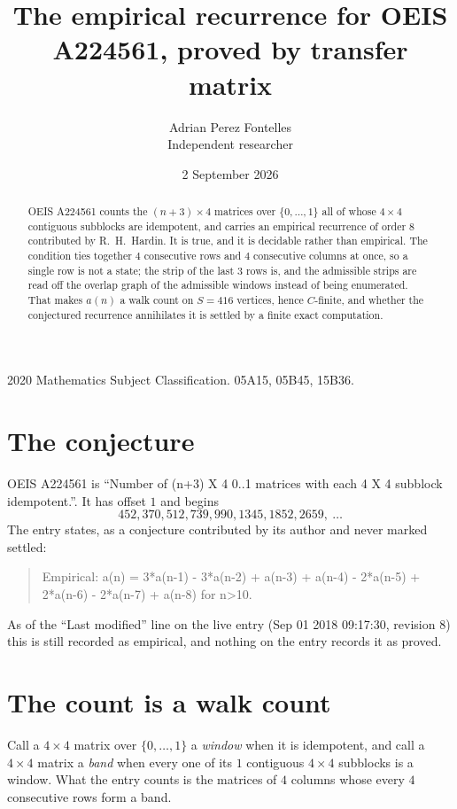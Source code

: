 \documentclass[11pt,a4paper]{article}
\title{The empirical recurrence for OEIS A224561, proved by transfer matrix}
\author{Adrian Perez Fontelles\\ \small Independent researcher}
\date{2 September 2026}
\theoremstyle{plain}
\theoremstyle{definition}
\begin{document}
\maketitle

\begin{abstract}
OEIS A224561 counts the $(n+3)\times4$ matrices over $\{0,\dots,1\}$ all of whose
$4\times4$ contiguous subblocks are idempotent, and carries an empirical recurrence of order
$8$ contributed by R.~H.~Hardin. It is true, and it is decidable rather than empirical.
The condition ties together $4$ consecutive rows and $4$ consecutive columns at once, so a
single row is not a state; the strip of the last $3$ rows is, and the admissible strips
are read off the overlap graph of the admissible windows instead of being enumerated. That
makes $a(n)$ a walk count on $S=416$ vertices, hence $C$-finite, and whether the conjectured
recurrence annihilates it is settled by a finite exact computation.
\end{abstract}

\noindent\small 2020 Mathematics Subject Classification. 05A15, 05B45, 15B36.\normalsize

\section{The conjecture}

OEIS A224561 is ``Number of (n+3) X 4 0..1 matrices with each 4 X 4 subblock idempotent.''. It has offset $1$ and begins
\[
452, 370, 512, 739, 990, 1345, 1852, 2659,\ \dots
\]
The entry states, as a conjecture contributed by its author and never marked settled:
\begin{quote}
Empirical: a(n) = 3*a(n-1) - 3*a(n-2) + a(n-3) + a(n-4) - 2*a(n-5) + 2*a(n-6) - 2*a(n-7) + a(n-8) for n>10.
\end{quote}
As of the ``Last modified'' line on the live entry (Sep 01 2018 09:17:30, revision 8) this is still
recorded as empirical, and nothing on the entry records it as proved.

\section{The count is a walk count}

Call a $4\times4$ matrix over $\{0,\dots,1\}$ a \emph{window} when it is idempotent, and
call a $4\times4$ matrix a \emph{band} when every one of its $1$ contiguous
$4\times4$ subblocks is a window. What the entry counts is the matrices of $4$ columns
whose every $4$ consecutive rows form a band.
\end{document}
